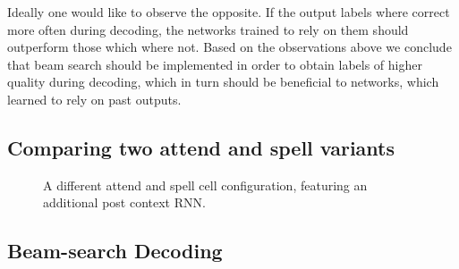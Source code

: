 Ideally one would like to observe the opposite. If the output labels where correct more often during decoding, the networks trained to rely on them should outperform those which where not. Based on the observations above we conclude that beam search should be implemented in order to obtain labels of higher quality during decoding, which in turn should be beneficial to networks, which learned to rely on past outputs.

\subsection{Comparing two attend and spell variants}
\begin{figure}
\centering

\caption{A different attend and spell cell configuration, featuring an additional post context RNN.}
\label{fig:lasVariants}
\end{figure}



\subsection{Beam-search Decoding}




